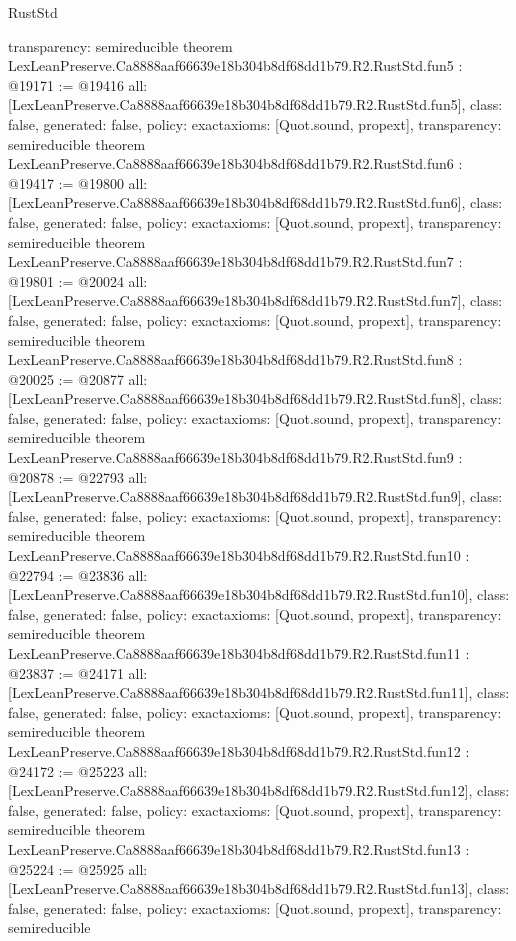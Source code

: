 \begin{lexlean}{RustStd}
\begin{coremodule}
{  transparency: semireducible
}
theorem LexLeanPreserve.Ca8888aaf66639e18b304b8df68dd1b79.R2.RustStd.fun5 : @19171 := @19416 {
  all: [LexLeanPreserve.Ca8888aaf66639e18b304b8df68dd1b79.R2.RustStd.fun5],
  class: false,
  generated: false,
  policy: exact{axioms: [Quot.sound, propext]},
  transparency: semireducible
}
theorem LexLeanPreserve.Ca8888aaf66639e18b304b8df68dd1b79.R2.RustStd.fun6 : @19417 := @19800 {
  all: [LexLeanPreserve.Ca8888aaf66639e18b304b8df68dd1b79.R2.RustStd.fun6],
  class: false,
  generated: false,
  policy: exact{axioms: [Quot.sound, propext]},
  transparency: semireducible
}
theorem LexLeanPreserve.Ca8888aaf66639e18b304b8df68dd1b79.R2.RustStd.fun7 : @19801 := @20024 {
  all: [LexLeanPreserve.Ca8888aaf66639e18b304b8df68dd1b79.R2.RustStd.fun7],
  class: false,
  generated: false,
  policy: exact{axioms: [Quot.sound, propext]},
  transparency: semireducible
}
theorem LexLeanPreserve.Ca8888aaf66639e18b304b8df68dd1b79.R2.RustStd.fun8 : @20025 := @20877 {
  all: [LexLeanPreserve.Ca8888aaf66639e18b304b8df68dd1b79.R2.RustStd.fun8],
  class: false,
  generated: false,
  policy: exact{axioms: [Quot.sound, propext]},
  transparency: semireducible
}
theorem LexLeanPreserve.Ca8888aaf66639e18b304b8df68dd1b79.R2.RustStd.fun9 : @20878 := @22793 {
  all: [LexLeanPreserve.Ca8888aaf66639e18b304b8df68dd1b79.R2.RustStd.fun9],
  class: false,
  generated: false,
  policy: exact{axioms: [Quot.sound, propext]},
  transparency: semireducible
}
theorem LexLeanPreserve.Ca8888aaf66639e18b304b8df68dd1b79.R2.RustStd.fun10 : @22794 := @23836 {
  all: [LexLeanPreserve.Ca8888aaf66639e18b304b8df68dd1b79.R2.RustStd.fun10],
  class: false,
  generated: false,
  policy: exact{axioms: [Quot.sound, propext]},
  transparency: semireducible
}
theorem LexLeanPreserve.Ca8888aaf66639e18b304b8df68dd1b79.R2.RustStd.fun11 : @23837 := @24171 {
  all: [LexLeanPreserve.Ca8888aaf66639e18b304b8df68dd1b79.R2.RustStd.fun11],
  class: false,
  generated: false,
  policy: exact{axioms: [Quot.sound, propext]},
  transparency: semireducible
}
theorem LexLeanPreserve.Ca8888aaf66639e18b304b8df68dd1b79.R2.RustStd.fun12 : @24172 := @25223 {
  all: [LexLeanPreserve.Ca8888aaf66639e18b304b8df68dd1b79.R2.RustStd.fun12],
  class: false,
  generated: false,
  policy: exact{axioms: [Quot.sound, propext]},
  transparency: semireducible
}
theorem LexLeanPreserve.Ca8888aaf66639e18b304b8df68dd1b79.R2.RustStd.fun13 : @25224 := @25925 {
  all: [LexLeanPreserve.Ca8888aaf66639e18b304b8df68dd1b79.R2.RustStd.fun13],
  class: false,
  generated: false,
  policy: exact{axioms: [Quot.sound, propext]},
  transparency: semireducible
}
\end{coremodule}
\end{lexlean}
